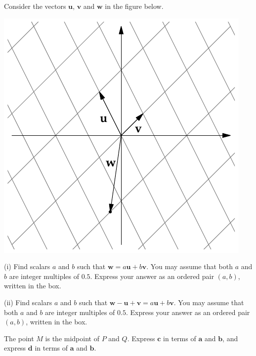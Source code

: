 \documentclass[svgnames]{watsonbook}
\begin{document}
\begin{aexercise}
Consider the vectors $\mathbf{u}$, $\mathbf{v}$ and $\mathbf{w}$ in the figure below. 

\begin{center}
  \includegraphics{exercisefigures/parallelogram}
\end{center}

(i) Find scalars $a$ and $b$ such that $\mathbf{w} = a\mathbf{u} + b\mathbf{v}$. You may assume that both $a$ and $b$ are integer multiples of $0.5$. Express your answer as an ordered pair $(a,b)$, written in the box. 

(ii) Find scalars $a$ and $b$ such that $\mathbf{w} - \mathbf{u} + \mathbf{v} = a\mathbf{u} + b\mathbf{v}$. You may assume that both $a$ and $b$ are integer multiples of $0.5$. Express your answer as an ordered pair $(a,b)$, written in the box. 
\end{aexercise}

\begin{aexercise}
  \begin{minipage}[t]{0.58\textwidth}
    The point $M$ is the midpoint of $P$ and $Q$. Express $\mathbf{c}$
    in terms of $\mathbf{a}$ and $\mathbf{b}$, and express $\mathbf{d}$
    in terms of $\mathbf{a}$ and $\mathbf{b}$.
  \end{minipage}
  \begin{minipage}[t]{0.4\textwidth}
  \end{minipage}
\end{aexercise}
\end{document}
